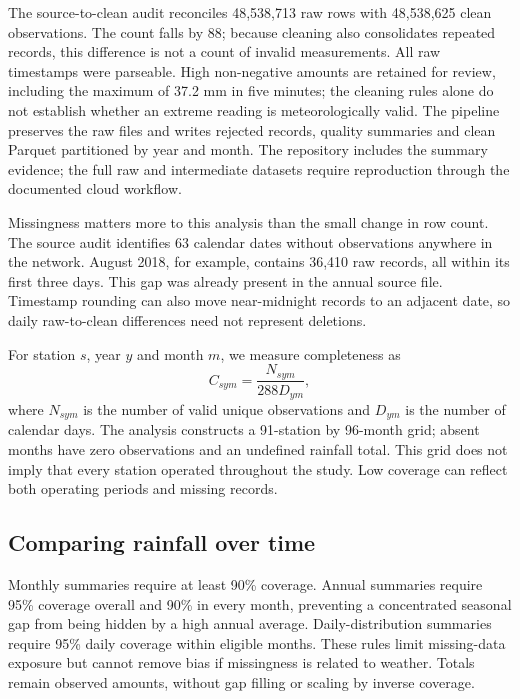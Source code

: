 The source-to-clean audit reconciles 48,538,713 raw rows with 48,538,625 clean observations. The count falls by 88; because cleaning also consolidates repeated records, this difference is not a count of invalid measurements. All raw timestamps were parseable. High non-negative amounts are retained for review, including the maximum of 37.2 mm in five minutes; the cleaning rules alone do not establish whether an extreme reading is meteorologically valid. The pipeline preserves the raw files and writes rejected records, quality summaries and clean Parquet partitioned by year and month. The repository includes the summary evidence; the full raw and intermediate datasets require reproduction through the documented cloud workflow.

Missingness matters more to this analysis than the small change in row count. The source audit identifies 63 calendar dates without observations anywhere in the network. August 2018, for example, contains 36,410 raw records, all within its first three days. This gap was already present in the annual source file. Timestamp rounding can also move near-midnight records to an adjacent date, so daily raw-to-clean differences need not represent deletions.

For station $s$, year $y$ and month $m$, we measure completeness as
\[
 C_{sym}=\frac{N_{sym}}{288D_{ym}},
\]
where $N_{sym}$ is the number of valid unique observations and $D_{ym}$ is the number of calendar days. The analysis constructs a 91-station by 96-month grid; absent months have zero observations and an undefined rainfall total. This grid does not imply that every station operated throughout the study. Low coverage can reflect both operating periods and missing records.


\subsection{Comparing rainfall over time}
Monthly summaries require at least 90\% coverage. Annual summaries require 95\% coverage overall and 90\% in every month, preventing a concentrated seasonal gap from being hidden by a high annual average. Daily-distribution summaries require 95\% daily coverage within eligible months. These rules limit missing-data exposure but cannot remove bias if missingness is related to weather. Totals remain observed amounts, without gap filling or scaling by inverse coverage.

